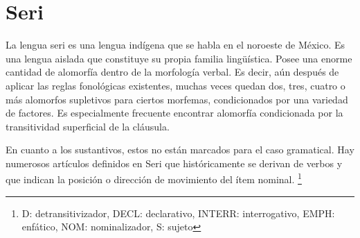 \section*{Seri}

\noindent La lengua seri es una lengua indígena que se habla en el noroeste de México. Es una lengua aislada que constituye su propia familia lingüística. Posee una enorme cantidad de alomorfía dentro de la morfología verbal. Es decir, aún después de aplicar las reglas fonológicas existentes, muchas veces quedan dos, tres, cuatro o más alomorfos supletivos para ciertos morfemas, condicionados por una variedad de factores. Es especialmente frecuente encontrar alomorfía condicionada por la transitividad superficial de la cláusula.

En cuanto a los sustantivos, estos no están marcados para el caso gramatical. Hay numerosos artículos definidos en Seri que históricamente se derivan de verbos y que indican la posición o dirección de movimiento del ítem nominal.
\footnote{D: detransitivizador, DECL: declarativo, INTERR: interrogativo, EMPH: enfático, NOM: nominalizador, S: sujeto}
\vspace{0.5cm}

